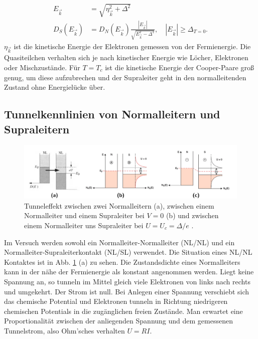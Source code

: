 \documentclass[twoside,        %
               BCOR12mm,       %
               english,ngerman, %
               fleqn,headsepline=false,footsepline=false
              ]{Vorlage/MFPREPORT}
\begin{document}
\begin{align}
    \label{eq:BCS}
    E_{\vec k}&=\sqrt{\eta_{\vec{k}}^2+\Delta^2}\\
    D_S(E_{\vec{k}})&=D_N(E_{\vec{k}})\frac{|E_{\vec k}|}{\sqrt{E_{\vec
    k}^2-\Delta^2}},\quad |E_{\vec k}|\geq\Delta_{T=0}.
\end{align}
$\eta_{\vec k}$ ist die kinetische Energie der Elektronen gemessen von der
Fermienergie. Die Quasiteilchen verhalten sich je nach kinetischer Energie wie
Löcher, Elektronen oder Mischzustände. Für $T=T_c$ ist die kinetische Energie
der Cooper-Paare groß genug, um diese aufzubrechen und der Supraleiter geht in den
normalleitenden Zustand ohne Energielücke über.

\subsection{Tunnelkennlinien von Normalleitern und Supraleitern}
\begin{figure}[]
    \begin{center}
        \includegraphics[width=\textwidth]{fig/tunnel.png}
    \end{center}
    \caption{Tunneleffekt zwischen zwei Normalleitern (a), zwischen einem
    Normalleiter und einem Supraleiter bei $V=0$ (b) und zwischen einem
    Normalleiter uns Supraleiter bei $U=U_c=\Delta/e$ \cite{dem}
   .}
    \label{fig:tunnel}
\end{figure}
Im Versuch werden sowohl ein Normalleiter-Normalleiter (NL/NL) und ein
Normalleiter-Supraleiterkontakt (NL/SL) verwendet. Die Situation eines NL/NL
Kontaktes ist in Abb. \ref{fig:tunnel} (a) zu sehen. Die Zustandsdichte eines
Normalleiters kann in der nähe der Fermienergie als konstant angenommen werden.
Liegt keine Spannung an, so tunneln im Mittel gleich viele Elektronen von links
nach rechts und umgekehrt. Der Strom ist null. Bei Anlegen einer Spannung
verschiebt sich das chemische Potential und Elektronen tunneln in Richtung
niedrigeren chemischen Potentials in die zugänglichen freien Zustände.
Man erwartet eine Proportionalität zwischen der anliegenden Spannung und dem
gemessenen Tunnelstrom, also Ohm'sches verhalten $U=RI$.
\end{document}
